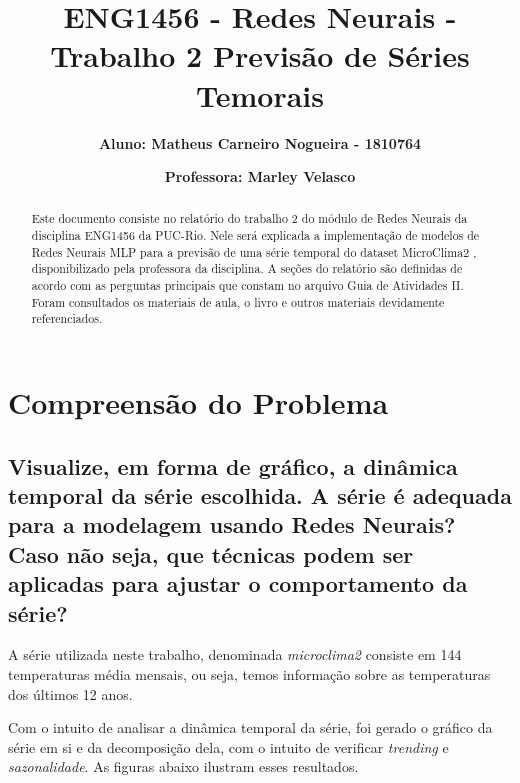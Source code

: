 \documentclass[12pt]{article}
\title{\textbf{ENG1456 - Redes Neurais - Trabalho 2 Previsão de Séries Temorais}}
\author{\textbf{Aluno: Matheus Carneiro Nogueira - 1810764}}
\affil{}
\author{\textbf{Professora: Marley Velasco}}
\affil{}
\date{}
\begin{document}
	\maketitle
	\tableofcontents
	
	
	\begin{abstract}
		Este documento consiste no relatório do trabalho 2 do módulo de Redes Neurais da disciplina ENG1456 da PUC-Rio. Nele será explicada a implementação de modelos de Redes Neurais MLP para a previsão de uma série temporal do dataset MicroClima2 , disponibilizado pela professora da disciplina. A seções do relatório são definidas de acordo com as perguntas principais que constam no arquivo Guia de Atividades II. Foram consultados os materiais de aula, o livro \cite{livro} e outros materiais devidamente referenciados.
	\end{abstract}
		
	\section{Compreensão do Problema}
	\subsection{Visualize, em forma de gráfico, a dinâmica temporal da série escolhida. A série é adequada para a modelagem usando Redes Neurais? Caso não seja, que técnicas podem ser aplicadas para ajustar o comportamento da série?}\label{subsec:1.1}
	
	A série utilizada neste trabalho, denominada \textit{microclima2} consiste em 144 temperaturas média mensais, ou seja, temos informação sobre as temperaturas dos últimos 12 anos.
	
	Com o intuito de analisar a dinâmica temporal da série, foi gerado o gráfico da série em si e da decomposição dela, com o intuito de verificar \textit{trending} e \textit{sazonalidade}. As figuras abaixo ilustram esses resultados.
	
\end{document}
